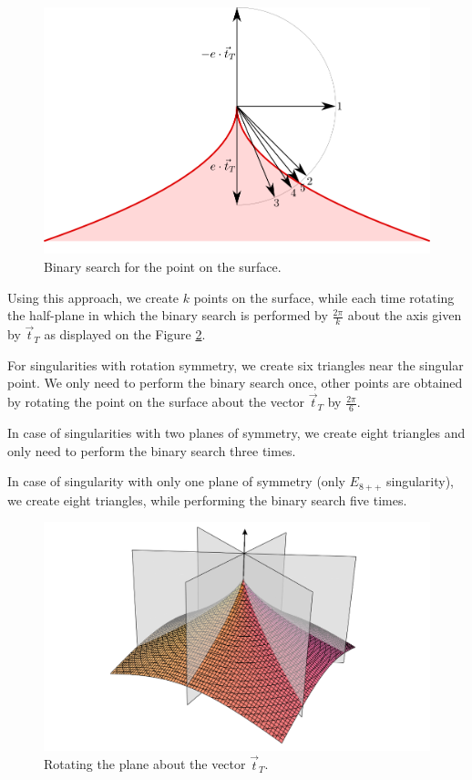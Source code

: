 \begin{figure}
    \centerline{\includegraphics[scale=0.5]{images/img41}}
    \caption[Binary search for the point on the surface]
    {Binary search for the point on the surface.}
    \label{img:41}
\end{figure}

Using this approach, we create $k$ points on the surface, while each time
rotating the half-plane in which the binary search is performed by $\frac{2\pi}{k}$
about the axis given by $\vec{t}_T$ as displayed on the Figure \ref{img:rotating-planes}.

For singularities with rotation symmetry, we create six
triangles near the singular point. We only need to perform the binary search once,
other points are obtained by rotating the point on the surface about the vector 
$\vec{t}_T$ by $\frac{2 \pi}{6}$.

In case of singularities with two planes of symmetry, we create eight triangles and only
need to perform the binary search three times.

In case of singularity with only one plane of symmetry (only $E_{8++}$ singularity),
we create eight triangles, while performing the binary search five times. 

\begin{figure}
    \centerline{\includegraphics[scale=0.3]{images/rotating-planes}}
    \caption[Rotating the plane about the vector]
    {Rotating the plane about the vector $\vec{t}_T$.}
    \label{img:rotating-planes}
\end{figure}

